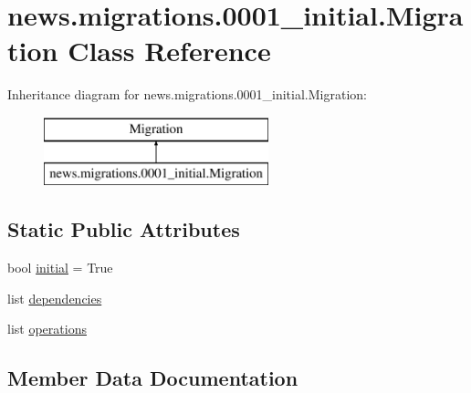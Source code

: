 \hypertarget{classnews_1_1migrations_1_10001__initial_1_1_migration}{}\section{news.\+migrations.0001\+\_\+initial.Migration Class Reference}
\label{classnews_1_1migrations_1_10001__initial_1_1_migration}
Inheritance diagram for news.\+migrations.0001\+\_\+initial.Migration\+:\begin{figure}[H]
\begin{center}
\leavevmode
\includegraphics[height=2.000000cm]{classnews_1_1migrations_1_10001__initial_1_1_migration}
\end{center}
\end{figure}
\subsection*{Static Public Attributes}
\begin{DoxyCompactItemize}
\item 
bool \mbox{\hyperlink{classnews_1_1migrations_1_10001__initial_1_1_migration_aabc5dbf8fca555e21bb4e345893694a2}{initial}} = True
\item 
list \mbox{\hyperlink{classnews_1_1migrations_1_10001__initial_1_1_migration_a3fef00e0c6160b568045ee2b8f9e2684}{dependencies}}
\item 
list \mbox{\hyperlink{classnews_1_1migrations_1_10001__initial_1_1_migration_ae137eaa618a2a194cebaab9f59d42526}{operations}}
\end{DoxyCompactItemize}


\subsection{Member Data Documentation}
\mbox{\label{classnews_1_1migrations_1_10001__initial_1_1_migration_a3fef00e0c6160b568045ee2b8f9e2684}} 
